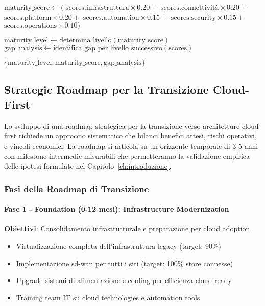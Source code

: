 \begin{algorithm}[H]
\begin{algorithmic}[1]
    \State $\text{maturity\_score} \leftarrow ($
    \State \hspace{2em} $\text{scores.infrastruttura} \times 0.20 +$
    \State \hspace{2em} $\text{scores.connettività} \times 0.20 +$
    \State \hspace{2em} $\text{scores.platform} \times 0.20 +$
    \State \hspace{2em} $\text{scores.automation} \times 0.15 +$
    \State \hspace{2em} $\text{scores.security} \times 0.15 +$
    \State \hspace{2em} $\text{scores.operations} \times 0.10)$
    
    \State $\text{maturity\_level} \leftarrow \text{determina\_livello}(\text{maturity\_score})$
    \State $\text{gap\_analysis} \leftarrow \text{identifica\_gap\_per\_livello\_successivo}(\text{scores})$
    
    \State \Return $\{\text{maturity\_level}, \text{maturity\_score}, \text{gap\_analysis}\}$
\EndFunction
\end{algorithmic}
\end{algorithm}

\subsection{Strategic Roadmap per la Transizione Cloud-First}
\label{subsec:strategic-roadmap}

Lo sviluppo di una roadmap strategica per la transizione verso architetture cloud-first richiede un approccio sistematico che bilanci benefici attesi, rischi operativi, e vincoli economici. La roadmap si articola su un orizzonte temporale di 3-5 anni con milestone intermedie misurabili che permetteranno la validazione empirica delle ipotesi formulate nel Capitolo~\ref{ch:introduzione}.

\subsubsection{Fasi della Roadmap di Transizione}

\paragraph{Fase 1 - Foundation (0-12 mesi): Infrastructure Modernization}

\textbf{Obiettivi}: Consolidamento infrastrutturale e preparazione per cloud adoption
\begin{itemize}
    \item Virtualizzazione completa dell'infrastruttura legacy (target: 90\%)
    \item Implementazione \gls{sd-wan} per tutti i siti (target: 100\% store connesse)
    \item Upgrade sistemi di alimentazione e cooling per efficienza cloud-ready
    \item Training team IT su cloud technologies e automation tools
\end{itemize}

